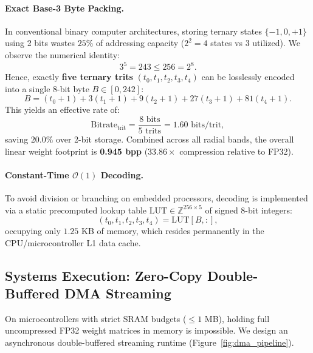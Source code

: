 \documentclass[11pt,a4paper]{article}
\begin{document}
\paragraph{Exact Base-3 Byte Packing.} In conventional binary computer architectures, storing ternary states $\{-1, 0, +1\}$ using 2 bits wastes $25\%$ of addressing capacity ($2^2 = 4$ states vs 3 utilized). We observe the numerical identity:
\begin{equation}
    3^5 = 243 \le 256 = 2^8.
\end{equation}
Hence, exactly \textbf{five ternary trits} $(t_0, t_1, t_2, t_3, t_4)$ can be losslessly encoded into a single 8-bit byte $B \in [0, 242]$:
\begin{equation}
    B = (t_0 + 1) + 3(t_1 + 1) + 9(t_2 + 1) + 27(t_3 + 1) + 81(t_4 + 1).
\end{equation}
This yields an effective rate of:
\begin{equation}
    \text{Bitrate}_{\text{trit}} = \frac{8 \text{ bits}}{5 \text{ trits}} = 1.60 \text{ bits/trit},
\end{equation}
saving $20.0\%$ over 2-bit storage. Combined across all radial bands, the overall linear weight footprint is \textbf{0.945 bpp} ($33.86\times$ compression relative to FP32).

\paragraph{Constant-Time $\mathcal{O}(1)$ Decoding.} To avoid division or branching on embedded processors, decoding is implemented via a static precomputed lookup table $\text{LUT} \in \mathbb{Z}^{256 \times 5}$ of signed 8-bit integers:
\begin{equation}
    (t_0, t_1, t_2, t_3, t_4) = \text{LUT}[B, :],
\end{equation}
occupying only $1.25$ KB of memory, which resides permanently in the CPU/microcontroller L1 data cache.

\subsection{Systems Execution: Zero-Copy Double-Buffered DMA Streaming}
On microcontrollers with strict SRAM budgets ($\le 1$ MB), holding full uncompressed FP32 weight matrices in memory is impossible. We design an asynchronous double-buffered streaming runtime (Figure~\ref{fig:dma_pipeline}).
\end{document}
